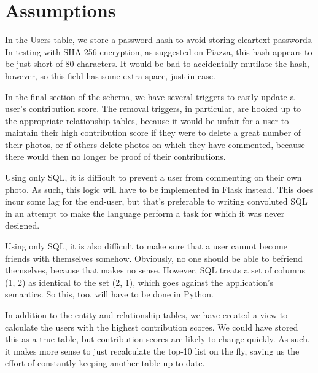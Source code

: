 \documentclass[letterpaper]{article}
\begin{document}
  \section{Assumptions}
  In the Users table, we store a password hash to avoid storing cleartext
  passwords.  In testing with SHA-256 encryption, as suggested on Piazza, this
  hash appears to be just short of 80 characters.  It would be bad to
  accidentally mutilate the hash, however, so this field has some extra space,
  just in case.

  In the final section of the schema, we have several triggers to easily update
  a user's contribution score.  The removal triggers, in particular, are hooked
  up to the appropriate relationship tables, because it would be unfair for a
  user to maintain their high contribution score if they were to delete a great
  number of their photos, or if others delete photos on which they have
  commented, because there would then no longer be proof of their contributions.

  Using only SQL, it is difficult to prevent a user from commenting on their own
  photo.  As such, this logic will have to be implemented in Flask instead.
  This does incur some lag for the end-user, but that's preferable to writing
  convoluted SQL in an attempt to make the language perform a task for which it
  was never designed.

  Using only SQL, it is also difficult to make sure that a user cannot become
  friends with themselves somehow.  Obviously, no one should be able to befriend
  themselves, because that makes no sense.  However, SQL treats a set of columns
  (1, 2) as identical to the set (2, 1), which goes against the application's
  semantics.  So this, too, will have to be done in Python.

  In addition to the entity and relationship tables, we have created a view to
  calculate the users with the highest contribution scores.  We could have
  stored this as a true table, but contribution scores are likely to change
  quickly.  As such, it makes more sense to just recalculate the top-10 list on
  the fly, saving us the effort of constantly keeping another table up-to-date.
\end{document}
